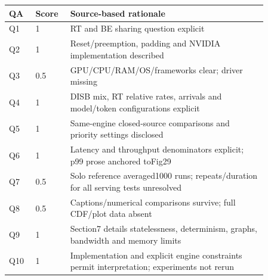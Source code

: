 \begin{longtable}{P{0.09\linewidth}P{0.10\linewidth}P{0.67\linewidth}}
\toprule QA & Score & Source-based rationale\\\midrule\endhead
Q1 & 1 & RT and BE sharing question explicit\\
Q2 & 1 & Reset/preemption, padding and NVIDIA implementation described\\
Q3 & 0.5 & GPU/CPU/RAM/OS/frameworks clear; driver missing\\
Q4 & 1 & DISB mix, RT relative rates, arrivals and model/token configurations explicit\\
Q5 & 1 & Same-engine closed-source comparisons and priority settings disclosed\\
Q6 & 1 & Latency and throughput denominators explicit; p99 prose anchored toFig29\\
Q7 & 0.5 & Solo reference averaged1000 runs; repeats/duration for all serving tests unresolved\\
Q8 & 0.5 & Captions/numerical comparisons survive; full CDF/plot data absent\\
Q9 & 1 & Section7 details statelessness, determinism, graphs, bandwidth and memory limits\\
Q10 & 1 & Implementation and explicit engine constraints permit interpretation; experiments not rerun\\
\bottomrule\end{longtable}

